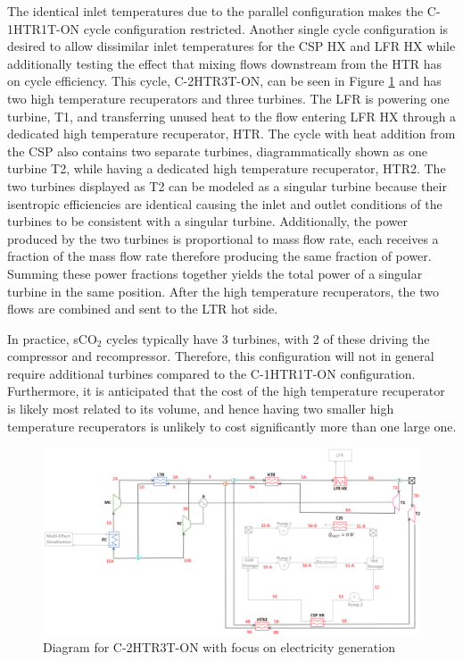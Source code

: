 \begin{paracol}{2}
The identical inlet temperatures due to the parallel configuration makes the C-1HTR1T-ON cycle configuration restricted. Another single cycle configuration is desired to allow dissimilar inlet temperatures for the CSP HX and LFR HX while additionally testing the effect that mixing flows downstream from the HTR has on cycle efficiency. This cycle, C-2HTR3T-ON, can be seen in Figure \ref{c-2htr3t-on} and has two high temperature recuperators and three turbines. The LFR is powering one turbine, T1, and transferring unused heat to the flow entering LFR HX through a dedicated high temperature recuperator, HTR. The cycle with heat addition from the CSP also contains two separate turbines, diagrammatically shown as one turbine T2, while having a dedicated high temperature recuperator, HTR2. The two turbines displayed as T2 can be modeled as a singular turbine because their isentropic efficiencies are identical causing the inlet and outlet conditions of the turbines to be consistent with a singular turbine. Additionally, the power produced by the two turbines is proportional to mass flow rate, each receives a fraction of the mass flow rate therefore producing the same fraction of power. Summing these power fractions together yields the total power of a singular turbine in the same position. 
After the high temperature recuperators, the two flows are combined and sent to the LTR hot side. 

In practice, sCO$_2$ cycles typically have 3 turbines, with 2 of these driving the compressor and recompressor. Therefore, this configuration will not in general require additional turbines compared to the C-1HTR1T-ON configuration. Furthermore, it is anticipated that the cost of the high temperature recuperator is likely most related to its volume, and hence having two smaller high temperature recuperators is unlikely to cost significantly more than one large one. 

\end{paracol}
\begin{figure}[H]
    \widefigure
    \includegraphics[width=\linewidth]{Definitions/c-2htr3t-on.pdf}
    \caption{Diagram for C-2HTR3T-ON with focus on electricity generation\label{c-2htr3t-on}}
\end{figure}
